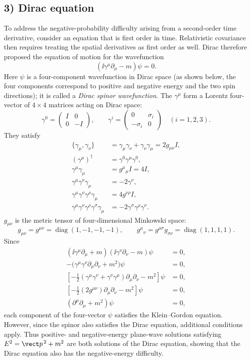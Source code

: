 \subsection*{3) Dirac equation}
To address the negative-probability difficulty arising from a second-order time derivative, consider an equation that is first order in time. Relativistic covariance then requires treating the spatial derivatives as first order as well. Dirac therefore proposed the equation of motion for the wavefunction
\[
(\ii\gamma^\mu\partial_\mu-m)\psi=0.
\]
Here $\psi$ is a four-component wavefunction in Dirac space (as shown below, the four components correspond to positive and negative energy and the two spin directions); it is called a \emph{Dirac spinor wavefunction}. The $\gamma^\mu$ form a Lorentz four-vector of $4\times4$ matrices acting on Dirac space:
\[
\gamma^0=\begin{pmatrix}I&0\\0&-I\end{pmatrix},\qquad
\gamma^i=\begin{pmatrix}0&\sigma_i\\-\sigma_i&0\end{pmatrix}\quad (i=1,2,3).
\]
They satisfy
\begin{align*}
\{\gamma_\mu,\gamma_\nu\}&=\gamma_\mu\gamma_\nu+\gamma_\nu\gamma_\mu=2g_{\mu\nu}I,\\
(\gamma^\mu)^\dagger&=\gamma^0\gamma^\mu\gamma^0,\\
\gamma^\mu\gamma_\mu&=g^\mu{}_{\mu}I=4I,\\
\gamma^\mu\gamma^\nu\gamma_\mu&=-2\gamma^\nu,\\
\gamma^\mu\gamma^\nu\gamma^\rho\gamma_\mu&=4g^{\nu\rho}I,\\
\gamma^\mu\gamma^\nu\gamma^\rho\gamma^\sigma\gamma_\mu&=-2\gamma^\sigma\gamma^\rho\gamma^\nu.
\end{align*}
$g_{\mu\nu}$ is the metric tensor of four-dimensional Minkowski space:
\[
g_{\mu\nu}=g^{\mu\nu}=\operatorname{diag}(1,-1,-1,-1),\qquad
 g^\mu{}_{\nu}=g^{\mu\sigma}g_{\sigma\nu}=\operatorname{diag}(1,1,1,1).
\]
Since
\begin{align*}
(\ii\gamma^\mu\partial_\mu+m)(\ii\gamma^\nu\partial_\nu-m)\psi&=0,\\
-\bigl(\gamma^\mu\gamma^\nu\partial_\mu\partial_\nu+m^2\bigr)\psi&=0,\\
\left[-\frac12(\gamma^\mu\gamma^\nu+\gamma^\nu\gamma^\mu)\partial_\mu\partial_\nu-m^2\right]\psi&=0,\\
\left[-\frac12(2g^{\mu\nu})\partial_\mu\partial_\nu-m^2\right]\psi&=0,\\
(\partial^\mu\partial_\mu+m^2)\psi&=0,
\end{align*}
each component of the four-vector $\psi$ satisfies the Klein--Gordon equation. However, since the spinor also satisfies the Dirac equation, additional conditions apply. Thus positive- and negative-energy plane-wave solutions satisfying $E^2=\vect p^{\,2}+m^2$ are both solutions of the Dirac equation, showing that the Dirac equation also has the negative-energy difficulty.

